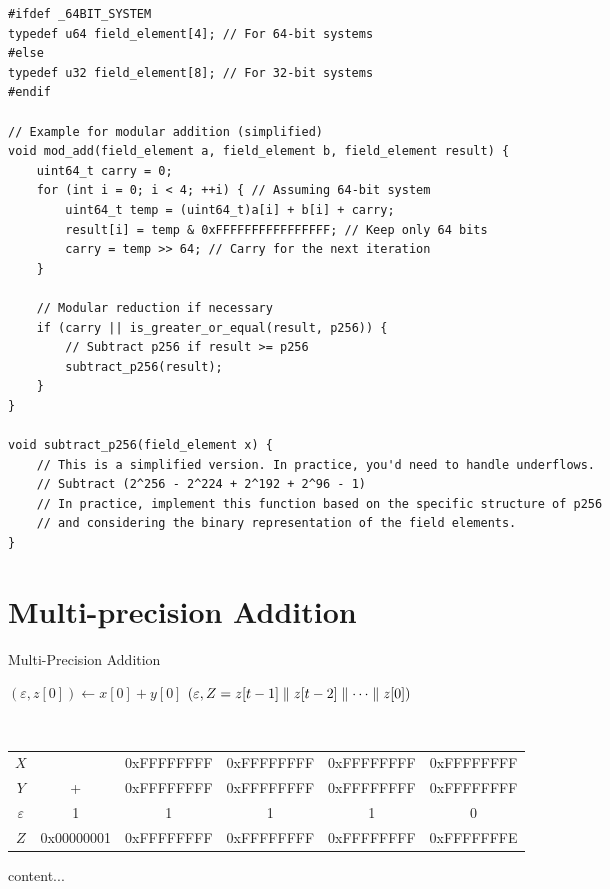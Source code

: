 \newpage

\vspace{4pt}
\begin{lstlisting}[style=C]
#ifdef _64BIT_SYSTEM
typedef u64 field_element[4]; // For 64-bit systems
#else
typedef u32 field_element[8]; // For 32-bit systems
#endif

// Example for modular addition (simplified)
void mod_add(field_element a, field_element b, field_element result) {
	uint64_t carry = 0;
	for (int i = 0; i < 4; ++i) { // Assuming 64-bit system
		uint64_t temp = (uint64_t)a[i] + b[i] + carry;
		result[i] = temp & 0xFFFFFFFFFFFFFFFF; // Keep only 64 bits
		carry = temp >> 64; // Carry for the next iteration
	}
	
	// Modular reduction if necessary
	if (carry || is_greater_or_equal(result, p256)) {
		// Subtract p256 if result >= p256
		subtract_p256(result);
	}
}

void subtract_p256(field_element x) {
	// This is a simplified version. In practice, you'd need to handle underflows.
	// Subtract (2^256 - 2^224 + 2^192 + 2^96 - 1)
	// In practice, implement this function based on the specific structure of p256
	// and considering the binary representation of the field elements.
}
\end{lstlisting}

\newpage
\section{Multi-precision Addition}

\begin{algorithm}[H]
	\DontPrintSemicolon
	\caption{Multi-Precision Addition}
	\BlankLine
	$(\varepsilon,z[0])\gets x[0]+y[0]$\;
	\Return $(\varepsilon, Z=z[t-1]\parallel z[t-2]\parallel\cdots\parallel z[0])$\;
\end{algorithm}
\begin{example}
\ \begin{table}[h!]\centering\renewcommand{\arraystretch}{1.25}
	{\ttfamily\begin{tabular*}{\textwidth}{@{\extracolsep{\fill}}cccccc}
	$X$ & & 0xFFFFFFFF & 0xFFFFFFFF & 0xFFFFFFFF & 0xFFFFFFFF \\
	$Y$ & + & 0xFFFFFFFF & 0xFFFFFFFF & 0xFFFFFFFF & 0xFFFFFFFF \\
	$\varepsilon$ & 1 & 1 & 1 & 1 & 0 \\ \cline{2-6}
	$Z$ & 0x00000001 & 0xFFFFFFFF & 0xFFFFFFFF & 0xFFFFFFFF & 0xFFFFFFFE \\
	\end{tabular*}}
\end{table}
\end{example}

\begin{note}
	content...
\end{note}


